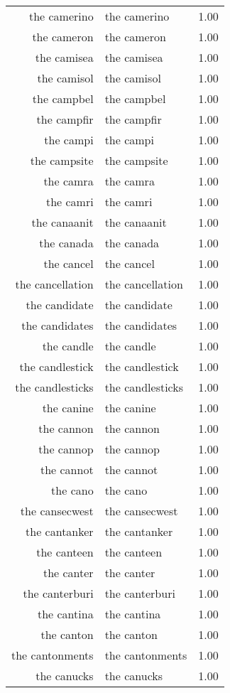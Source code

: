 \begin{table}[ht]
\begin{tabular}{rlr}
  the camerino & the camerino & 1.00 \\ 
  the cameron & the cameron & 1.00 \\ 
  the camisea & the camisea & 1.00 \\ 
  the camisol & the camisol & 1.00 \\ 
  the campbel & the campbel & 1.00 \\ 
  the campfir & the campfir & 1.00 \\ 
  the campi & the campi & 1.00 \\ 
  the campsite & the campsite & 1.00 \\ 
  the camra & the camra & 1.00 \\ 
  the camri & the camri & 1.00 \\ 
  the canaanit & the canaanit & 1.00 \\ 
  the canada & the canada & 1.00 \\ 
  the cancel & the cancel & 1.00 \\ 
  the cancellation & the cancellation & 1.00 \\ 
  the candidate & the candidate & 1.00 \\ 
  the candidates & the candidates & 1.00 \\ 
  the candle & the candle & 1.00 \\ 
  the candlestick & the candlestick & 1.00 \\ 
  the candlesticks & the candlesticks & 1.00 \\ 
  the canine & the canine & 1.00 \\ 
  the cannon & the cannon & 1.00 \\ 
  the cannop & the cannop & 1.00 \\ 
  the cannot & the cannot & 1.00 \\ 
  the cano & the cano & 1.00 \\ 
  the cansecwest & the cansecwest & 1.00 \\ 
  the cantanker & the cantanker & 1.00 \\ 
  the canteen & the canteen & 1.00 \\ 
  the canter & the canter & 1.00 \\ 
  the canterburi & the canterburi & 1.00 \\ 
  the cantina & the cantina & 1.00 \\ 
  the canton & the canton & 1.00 \\ 
  the cantonments & the cantonments & 1.00 \\ 
  the canucks & the canucks & 1.00 \\ 

\end{tabular}
\end{table}
